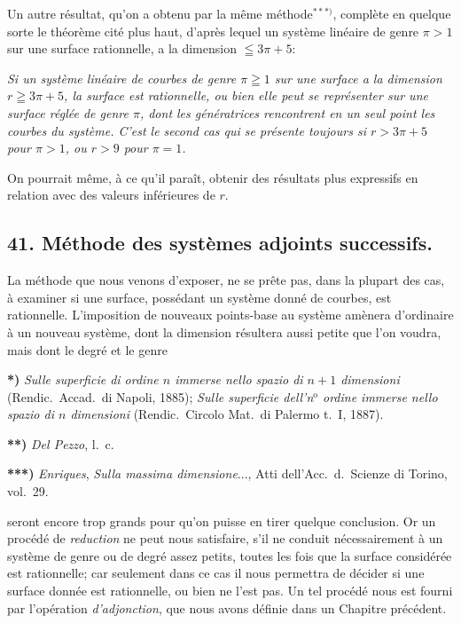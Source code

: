 \documentclass{article}
\begin{document}
Un autre résultat, qu'on a obtenu par la même méthode${}^{***)}$, complète en quelque sorte le théorème cité plus haut, d'après lequel un système linéaire de genre $\pi > 1$ sur une surface rationnelle, a la dimension $\leqq 3\pi + 5$:

\emph{Si un système linéaire de courbes de genre $\pi \geqq 1$ sur une surface a la dimension $r \geqq 3\pi + 5$, la surface est rationnelle, ou bien elle peut se représenter sur une surface réglée de genre $\pi$, dont les génératrices rencontrent en un seul point les courbes du système. C'est le second cas qui se présente toujours si $r > 3\pi + 5$ pour $\pi > 1$, ou $r > 9$ pour $\pi = 1$.}

On pourrait même, à ce qu'il paraît, obtenir des résultats plus expressifs en relation avec des valeurs inférieures de $r$.

\subsection*{41. Méthode des systèmes adjoints successifs.}

La méthode que nous venons d'exposer, ne se prête pas, dans la plupart des cas, à examiner si une surface, possédant un système donné de courbes, est rationnelle. L'imposition de nouveaux points-base au système amènera d'ordinaire à un nouveau système, dont la dimension résultera aussi petite que l'on voudra, mais dont le degré et le genre

\textbf{*)} \emph{Sulle superficie di ordine $n$ immerse nello spazio di $n + 1$ dimensioni} (Rendic.\ Accad.\ di Napoli, 1885); \emph{Sulle superficie dell'n${}^{\text{o}}$ ordine immerse nello spazio di $n$ dimensioni} (Rendic.\ Circolo Mat.\ di Palermo t.\ I, 1887).

\textbf{**)} \emph{Del Pezzo}, l.\ c.

\textbf{***)} \emph{Enriques}, \emph{Sulla massima dimensione}..., Atti dell'Acc.\ d.\ Scienze di Torino, vol.\ 29.

seront encore trop grands pour qu'on puisse en tirer quelque conclusion. Or un procédé de \emph{reduction} ne peut nous satisfaire, s'il ne conduit nécessairement à un système de genre ou de degré assez petits, toutes les fois que la surface considérée est rationnelle; car seulement dans ce cas il nous permettra de décider si une surface donnée est rationnelle, ou bien ne l'est pas. Un tel procédé nous est fourni par l'opération \emph{d'adjonction}, que nous avons définie dans un Chapitre précédent.
\end{document}
